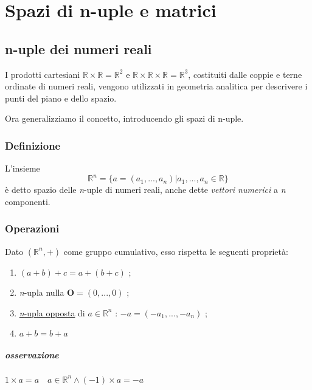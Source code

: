 \chapter{Spazi di n-uple e matrici}

	\section{n-uple dei numeri reali}
		\begin{comment}
		vettori numerici con n componenti
		\end{comment}
		
		I prodotti cartesiani $ \mathbb{R} \times \mathbb{R} = \mathbb{R}^2 $ e $ \mathbb{R} \times \mathbb{R} \times \mathbb{R} = \mathbb{R}^3 $, costituiti dalle coppie e terne ordinate di numeri reali, vengono utilizzati in geometria analitica per descrivere i punti del piano e dello spazio.
		
		Ora generalizziamo il concetto, introducendo gli spazi di n-uple.
		
		\subsection{Definizione} 
			L'insieme
			$$ \mathbb{R}^n = \{ a = (a_{1}, ..., a_{n}) | a_{1}, ..., a_{n} \in \mathbb{R} \} $$
			è detto spazio delle \textit{n}-uple di numeri reali, anche dette \textit{vettori numerici} a \textit{n} componenti.
		
		\subsection{Operazioni}
			Dato $ (\mathbb{R}^n, +) $ come gruppo cumulativo, esso rispetta le seguenti proprietà:
			\begin{enumerate}
				\item $ ( a + b ) + c = a + ( b + c ) $ ;
				\item \textit{n}-upla nulla $ \textbf{O} = (0, ..., 0) $ ;
				\item \underline{\textit{n}-upla opposta} di $ a \in \mathbb{R}^n $ : $ - a = ( -a_{1}, ..., -a_{n} ) $ ;
				\item $ a + b = b + a $
			\end{enumerate}
			\paragraph{osservazione} $ 1 \times a = a \quad a \in \mathbb{R}^n \wedge (-1) \times a = -a $
		
